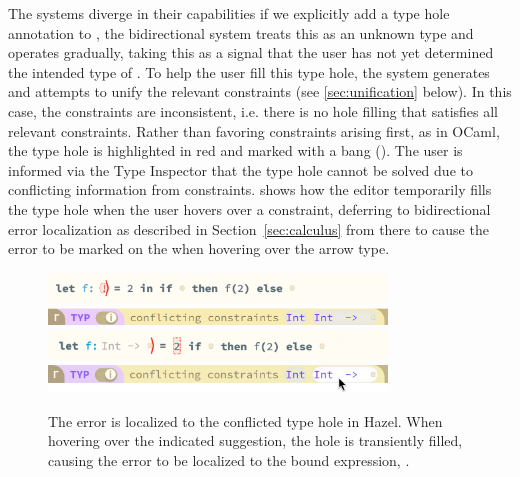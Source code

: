 The systems diverge in their capabilities if we explicitly add a type hole annotation to , the bidirectional system treats this as an unknown type and operates gradually, taking this as a signal that the user has not yet determined the intended type of . To help the user fill this type hole, the system generates and attempts to unify the relevant constraints (see \cref{sec:unification} below). In this case, the constraints are inconsistent, i.e. there is no hole filling that satisfies all relevant constraints. Rather than favoring constraints arising first, as in OCaml, the type hole is highlighted in red and marked with a bang (\li{!}). The user is informed via the Type Inspector that the type hole cannot be solved due to conflicting information from constraints.  shows how the editor temporarily fills the type hole when the user hovers over a constraint, deferring to bidirectional error localization as described in Section~\ref{sec:calculus} from there to cause the error to be marked on the  when hovering over the arrow type.
\begin{figure}[H]
\includegraphics[width=9cm]{images/example_conflict.png}
\includegraphics[width=9cm]{images/example-conflict-newnew.png}
\includegraphics[width=9cm]{images/example_conflict_hover.png}
\includegraphics[width=9cm]{images/example-conflict-hover-final.png}
\caption{The error is localized to the conflicted type hole in Hazel. When hovering over the indicated suggestion, the hole is transiently filled, causing the error to be localized to the bound expression, .}
\label{fig:editor_conflict}
\end{figure}

